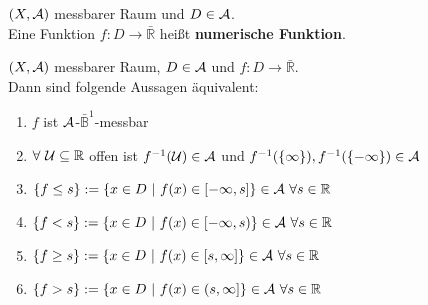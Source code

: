 \documentclass[11pt,a4paper,fleqn,openany]{report}
\begin{document}
    \begin{definition}
      $(X, \mathcal{A})$ messbarer Raum und $D \in \mathcal{A}$.\\
      Eine Funktion $f: D \to \bar{\mathbb{R}}$ heißt \textbf{numerische Funktion}.
    \end{definition}

    \begin{lemma}
      $(X, \mathcal{A})$ messbarer Raum, $D \in \mathcal{A}$ und $f: D \to \bar{\mathbb{R}}$.\\
      Dann sind folgende Aussagen äquivalent:
      \begin{enumerate}[label=(\roman*)]
        \item $f$ ist $\mathcal{A}$-$\bar{\mathbb{B}}^1$-messbar
        \item $\forall \ \mathcal{U} \subseteq \mathbb{R}$ offen ist $f^{-1}(\mathcal{U}) \in \mathcal{A}$ und $f^{-1}(\{\infty\}), f^{-1}(\{-\infty\}) \in \mathcal{A}$
        \item $\{f \leq s\} := \{x \in D \ |\ f(x) \in [-\infty, s]\} \in \mathcal{A} \ \forall s \in \mathbb{R}$
        \item $\{f < s\} := \{x \in D \ |\ f(x) \in [-\infty, s)\} \in \mathcal{A} \ \forall s \in \mathbb{R}$
        \item $\{f \geq s\} := \{x \in D \ |\ f(x) \in [s, \infty]\} \in \mathcal{A} \ \forall s \in \mathbb{R}$
        \item $\{f > s\} := \{x \in D \ |\ f(x) \in (s, \infty]\} \in \mathcal{A} \ \forall s \in \mathbb{R}$
      \end{enumerate}
    \end{lemma}
\end{document}
